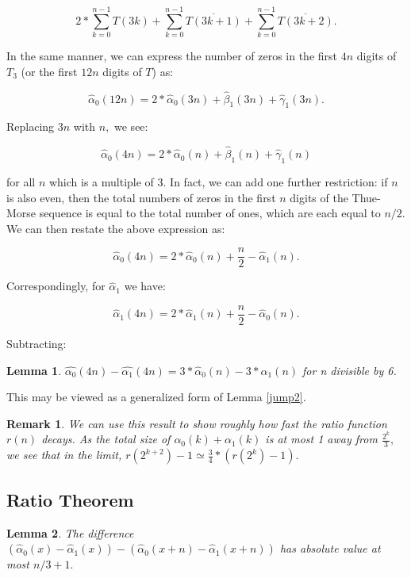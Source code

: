 \documentclass{article}
\newtheorem{lemma}{Lemma}[section]
\newtheorem{remark}{Remark}[section]
\begin{document}
$$2 * \sum_{k=0}^{n-1} T(3k) + \sum_{k=0}^{n-1} \overline{T(3k+1)} + \sum_{k=0}^{n-1} \overline{T(3k+2)}.$$

In the same manner, we can express the number of zeros in the first $4n$ digits of $T_3$ (or the first $12n$ digits of $T$) as:

$$\hat{\alpha}_0(12n) = 2 * \hat{\alpha}_0(3n) + \hat{\beta}_1(3n) + \hat{\gamma}_1(3n).$$

Replacing $3n$ with $n,$ we see:

$$\hat{\alpha}_0(4n) = 2 * \hat{\alpha}_0(n) + \hat{\beta}_1(n) + \hat{\gamma}_1(n)$$

for all $n$ which is a multiple of $3.$ In fact, we can add one further restriction: if $n$ is also even, then the total numbers of zeros in the first $n$ digits of the Thue-Morse sequence is equal to the total number of ones, which are each equal to $n/2.$ We can then restate the above expression as:

$$\hat{\alpha}_0(4n) = 2 * \hat{\alpha}_0(n) + \frac{n}{2} - \hat{\alpha}_1(n).$$

Correspondingly, for $\hat{\alpha}_1$ we have:

$$\hat{\alpha}_1(4n) = 2 * \hat{\alpha}_1(n) + \frac{n}{2} - \hat{\alpha}_0(n).$$

Subtracting:

\begin{lemma}
\label{ratiospec}
$\hat{\alpha_0}(4n) - \hat{\alpha_1}(4n) = 3 * \hat{\alpha}_0(n) - 3 * \hat{\alpha}_1(n)$ for n divisible by 6.
\end{lemma}

This may be viewed as a generalized form of Lemma \ref{jump2}.

\begin{remark}
We can use this result to show roughly how fast the ratio function $r(n)$ decays. As the total size of $\alpha_0(k) + \alpha_1(k)$ is at most 1 away from $\frac{2^k}{3},$ we see that in the limit, $r(2^{k+2}) - 1 \simeq \frac{3}{4} * (r(2^k) - 1).$
\end{remark}

\subsection{Ratio Theorem}

\begin{lemma}
\label{diff}
The difference $(\hat{\alpha}_0(x) - \hat{\alpha}_1(x)) - (\hat{\alpha}_0(x+n) - \hat{\alpha}_1(x+n))$ has absolute value at most $n/3 + 1.$
\end{lemma}
\end{document}
